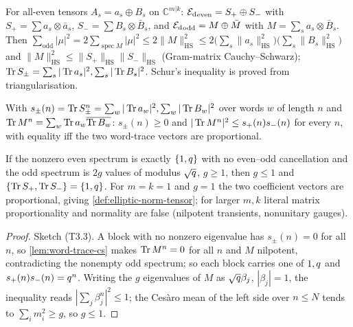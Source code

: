 \begin{theorem}
\label{thm:bosonic-blocks-hs}
For all-even tensors $A_s = a_s\oplus B_s$ on $\mathbb C^{m|k}$: ${\mathcal E_{\mathrm d}}_{\mathrm{even}} = S_+\oplus S_-$
with $S_+ = \sum a_s\otimes\bar a_s$, $S_- = \sum B_s\otimes\bar B_s$, and
${\mathcal E_{\mathrm d}}_{\mathrm{odd}} = M\oplus\bar M$ with $M = \sum_sa_s\otimes\bar B_s$. Then
$\sum_{\mathrm{odd}}|\mu|^2 = 2\sum_{\operatorname{spec}M}|\mu|^2\le2\|M\|_{\mathrm{HS}}^2\le %
2\bigl(\sum_s\|a_s\|_{\mathrm{HS}}^2\bigr)\bigl(\sum_s\|B_s\|_{\mathrm{HS}}^2\bigr)$ and
$\|M\|_{\mathrm{HS}}^2\le\|S_+\|_{\mathrm{HS}}\|S_-\|_{\mathrm{HS}}$ (Gram-matrix Cauchy--Schwarz);
$\operatorname{Tr} S_\pm = \sum_s|\operatorname{Tr} a_s|^2,\sum_s|\operatorname{Tr} B_s|^2$. Schur's inequality is proved from
triangularisation.
\end{theorem}

\begin{lemma}
\label{lem:word-trace-cs}
With $s_\pm(n) = \operatorname{Tr} S_\pm^n = \sum_w|\operatorname{Tr} a_w|^2,\sum_w|\operatorname{Tr} B_w|^2$ over words $w$ of length $n$
and $\operatorname{Tr} M^n = \sum_w\operatorname{Tr} a_w\overline{\operatorname{Tr} B_w}$: $s_\pm(n)\ge0$ and $|\operatorname{Tr} M^n|^2\le s_+(n)s_-(n)$
for every $n$, with equality iff the two word-trace vectors are proportional.
\end{lemma}

\begin{theorem}
\label{thm:bosonic-genus-bound}
If the nonzero even spectrum is exactly $\{1,q\}$ with no even--odd cancellation and the odd
spectrum is $2g$ values of modulus $\sqrt{q}$, $g\ge1$, then $g\le1$ and
$\{\operatorname{Tr} S_+,\operatorname{Tr} S_-\} = \{1,q\}$. For $m = k = 1$ and $g = 1$ the two coefficient vectors are
proportional, giving \cref{def:elliptic-norm-tensor}; for larger $m,k$ literal matrix
proportionality and normality are false (nilpotent transients, nonunitary gauges).
\end{theorem}

\begin{proof}
Sketch (T3.3). A block with no nonzero eigenvalue has $s_\pm(n) = 0$ for all $n$, so
\cref{lem:word-trace-cs} makes $\operatorname{Tr} M^n = 0$ for all $n$ and $M$ nilpotent, contradicting the
nonempty odd spectrum; so each block carries one of $1,q$ and $s_+(n)s_-(n) = q^n$. Writing
the $g$ eigenvalues of $M$ as $\sqrt{q}\beta_j$, $|\beta_j| = 1$, the inequality reads %
$|\sum_j\beta_j^n|^2\le1$; the Ces\`aro mean of the left side over $n\le N$ tends to %
$\sum_im_i^2\ge g$, so $g\le1$.
\end{proof}

